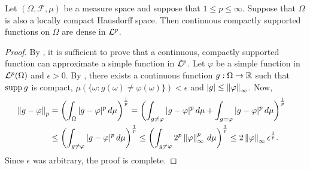 \begin{theorem}
\label{thm:lp:densitycc}
Let  $(\Omega, \mathcal{F}, \mu)$ be a measure space and suppose that $1 \leq p \leq \infty$. Suppose that $\Omega$ is also a locally compact Hausdorff space.
Then continuous compactly supported functions on $\Omega$ are dense in ${\mathcal {L}^p}$.
\end{theorem}

\begin{proof}
By , it is sufficient to prove that a continuous, compactly supported function can approximate a simple function in ${\mathcal {L}^p}$. Let $\varphi$ be a simple function in ${\mathcal {L}^p}(\Omega)$ and $\epsilon > 0$. By , there exists a continuous function $g : \Omega \to {\mathbb R}$ such that $\operatorname{supp} g$ is compact, $\mu(\{ \omega : g(\omega) \neq \varphi(\omega) \}) < \epsilon $ and $|g| \leq \left\lVert\varphi\right\rVert_\infty$. Now, \begin{align*}
    \left\lVert g - \varphi\right\rVert_p &= \left (\int_\Omega | g - \varphi |^p \, d\mu \right )^{\frac{1}{p}} = \left (\int_{g \neq \varphi} | g - \varphi |^p \, d\mu + \int_{g = \varphi} | g - \varphi |^p \, d\mu  \right )^{\frac{1}{p}} & \\
        &\leq \left ( \int_{g \neq \varphi} | g - \varphi|^p  \, d\mu\right)^{\frac{1}{p}} \leq \left ( \int_{g \neq \varphi} 2^p \left\lVert\varphi\right\rVert_\infty^p \, d\mu \right)^{\frac{1}{p}} \leq 2 \left\lVert\varphi\right\rVert_\infty \epsilon^{\frac{1}{p}}.
\end{align*}
Since $\epsilon$ was arbitrary, the proof is complete.
\end{proof}
